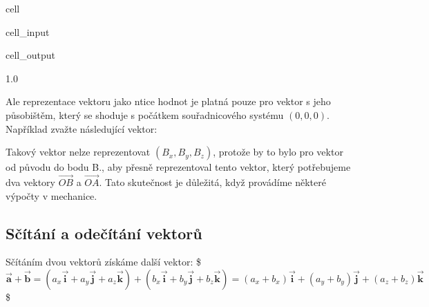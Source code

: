 \documentclass[letterpaper,10pt,english]{jupyterBook}
\begin{document}
\begin{sphinxuseclass}{cell}\begin{sphinxVerbatimInput}

\begin{sphinxuseclass}{cell_input}
\begin{sphinxVerbatim}[commandchars=\\\{\}]
\end{sphinxVerbatim}

\end{sphinxuseclass}\end{sphinxVerbatimInput}
\begin{sphinxVerbatimOutput}

\begin{sphinxuseclass}{cell_output}
\begin{sphinxVerbatim}[commandchars=\\\{\}]
1.0
\end{sphinxVerbatim}

\end{sphinxuseclass}\end{sphinxVerbatimOutput}

\end{sphinxuseclass}
\sphinxAtStartPar
Ale reprezentace vektoru jako n\sphinxhyphen{}tice hodnot je platná pouze pro vektor s jeho působištěm, který se shoduje s počátkem souřadnicového systému \( (0, 0, 0) \).
Například zvažte následující vektor:

\sphinxAtStartPar
Takový vektor nelze reprezentovat \((B_x, B_y, B_z)\), protože by to bylo pro vektor od původu do bodu B., aby přesně reprezentoval tento vektor, který potřebujeme dva vektory \(\vec{OB}\) a \(\vec{OA}\). Tato skutečnost je důležitá, když provádíme některé výpočty v mechanice.


\subsection{Sčítání a odečítání vektorů}
\label{\detokenize{Prednasky/0_2_Skal_xe1ry_a_vektory:scitani-a-odecitani-vektoru}}
\sphinxAtStartPar
Sčítáním dvou vektorů získáme další vektor:
\$\( \overrightarrow{\mathbf{a}} + \overrightarrow{\mathbf{b}} = (a_x\vec{\mathbf{i}} + a_y\vec{\mathbf{j}} + a_z\vec{\mathbf{k}}) + (b_x\vec{\mathbf{i}} + b_y\vec{\mathbf{j}} + b_z\vec{\mathbf{k}}) = 
(a_x+b_x)\vec{\mathbf{i}} + (a_y+b_y)\vec{\mathbf{j}} + (a_z+b_z)\vec{\mathbf{k}} \)\$
\end{document}
